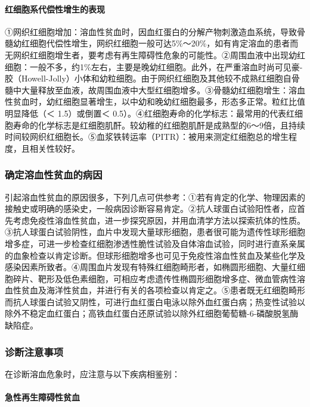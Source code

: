 \paragraph{红细胞系代偿性增生的表现}

①网织红细胞增加：溶血性贫血时，因血红蛋白的分解产物刺激造血系统，导致骨髓幼红细胞代偿性增生，网织红细胞一般可达5\%～20\%，如有肯定溶血的患者而无网织红细胞增生者，要考虑有再生障碍性危象的可能性。②周围血液中出现幼红细胞：一般不多，约1\%左右，主要是晚幼红细胞。此外，在严重溶血时尚可见豪-胶（Howell-Jolly）小体和幼粒细胞。由于网织红细胞及其他较不成熟红细胞自骨髓中大量释放至血液，故周围血液中大型红细胞增多。③骨髓幼红细胞增生：溶血性贫血时，幼红细胞显著增生，以中幼和晚幼红细胞最多，形态多正常。粒红比值明显降低（＜
1.5）或倒置＜
0.5）。④红细胞寿命的化学标志：最常用的代表红细胞寿命的化学标志是红细胞肌酐。较幼稚的红细胞肌酐是成熟型的6～9倍，且持续时间较网织红细胞长。⑤血浆铁转运率（PITR）：被用来测定红细胞总的增生程度，且相关性较好。

\subsubsection{确定溶血性贫血的病因}

引起溶血性贫血的原因很多，下列几点可供参考：①若有肯定的化学、物理因素的接触史或明确的感染史，一般病因诊断容易肯定。②抗人球蛋白试验阳性者，应首先考虑免疫性溶血性贫血，进一步探究原因，并用血清学方法以探索抗体的性质。③抗人球蛋白试验阴性，血片中发现大量球形细胞，患者很可能为遗传性球形细胞增多症，可进一步检查红细胞渗透性脆性试验及自体溶血试验，同时进行直系亲属的血象检查以肯定诊断。但球形细胞增多也可见于免疫性溶血性贫血及某些化学及感染因素所致者。④周围血片发现有特殊红细胞畸形者，如椭圆形细胞、大量红细胞碎片、靶形及低色素细胞，可相应考虑遗传性椭圆形细胞增多症、微血管病性溶血性贫血及海洋性贫血，并进行有关的各项检查以肯定之。⑤患者既无红细胞畸形而抗人球蛋白试验又阴性，可进行血红蛋白电泳以除外血红蛋白病；热变性试验以除外不稳定血红蛋白；高铁血红蛋白还原试验以除外红细胞葡萄糖-6-磷酸脱氢酶缺陷症。

\subsubsection{诊断注意事项}

在诊断溶血危象时，应注意与以下疾病相鉴别：

\paragraph{急性再生障碍性贫血}

